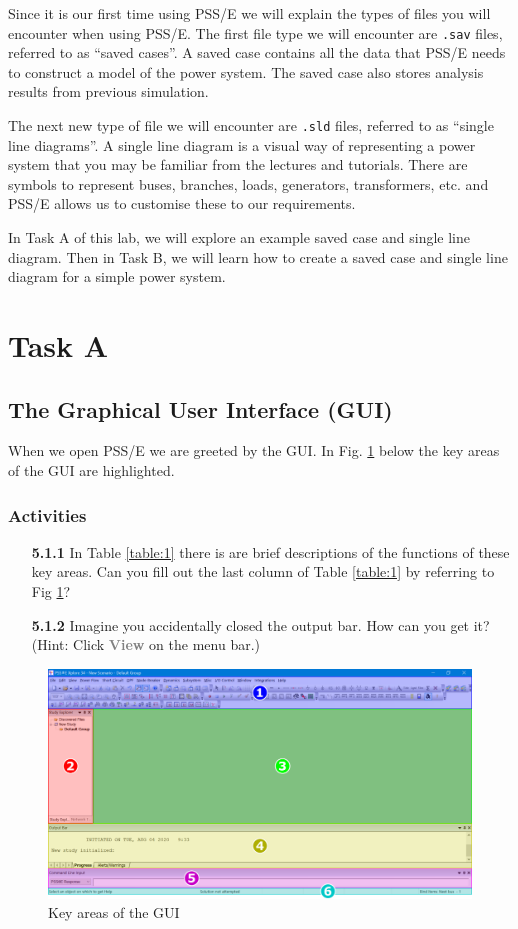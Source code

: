 \documentclass[paper=a4, fontsize=11pt]{article}
\begin{document}
Since it is our first time using PSS/E we will explain the types of files you will encounter when using PSS/E. The first file type we will encounter are \texttt{.sav} files, referred to as ``saved cases''. A saved case contains all the data that PSS/E needs to construct a model of the power system. The saved case also stores analysis results from previous simulation.

The next new type of file we will encounter are \texttt{.sld} files, referred to as ``single line diagrams''. A single line diagram is a visual way of representing a power system that you may be familiar from the lectures and tutorials. There are symbols to represent buses, branches, loads, generators, transformers, etc. and PSS/E allows us to customise these to our requirements.

In Task A of this lab, we will explore an example saved case and single line diagram. Then in Task B, we will learn how to create a saved case and single line diagram for a simple power system.

\section{Task A}
\subsection{The Graphical User Interface (GUI)}
When we open PSS/E we are greeted by the GUI. In Fig. \ref{fig:1} below the key areas of the GUI are highlighted.

\subsubsection*{Activities}
\begin{enumerate}
\item[\textbf{5.1.1}] In Table \ref{table:1} there is are brief descriptions of the functions of these key areas. Can you fill out the last column of Table \ref{table:1} by referring to Fig \ref{fig:1}?
\item[\textbf{5.1.2}] Imagine you accidentally closed the output bar. How can you get it? (Hint: Click \textbf{\textcolor{gray}{View}} on the menu bar.) 
\end{enumerate}

\begin{figure}[h]
\centering
\includegraphics[scale=0.32]{fig1_gui.pdf}
\caption{Key areas of the GUI}
\label{fig:1}
\end{figure}
\end{document}
